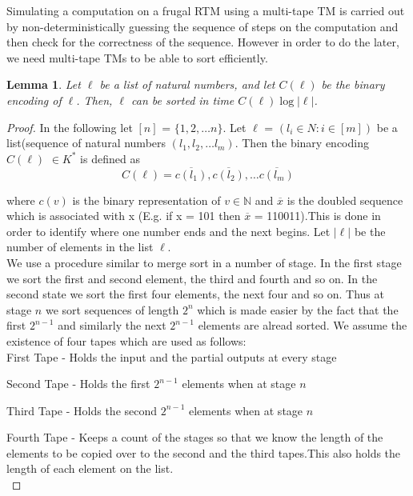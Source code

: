 \documentclass[english]{article}
\theoremstyle{plain}
\theoremstyle{definition}
\theoremstyle{plain}
\newtheorem{lem}[thm]{Lemma}
\begin{document}
Simulating a computation on a frugal RTM using a multi-tape TM is
carried out by non-deterministically guessing the sequence of steps on
the computation and then check for the correctness of the
sequence. However in order to do the later, we need multi-tape TMs to
be able to sort efficiently.

\begin{lem}
  Let $\ell$ be a list of natural numbers, and let $C(\ell)$ be the
  binary encoding of $\ell$. Then, $\ell$ can be sorted in time
  $C(\ell)\log|\ell|$.
\end{lem}

\begin{proof}
  In the following let $[n]$ = $\{1,2,\ldots n\}$. Let $\ell$ = $(l_i
  \in N: i \in [m])$ be a list(sequence of natural numbers $(l_1,l_2,
  \ldots l_m)$. Then the binary encoding $C(\ell)$ $\in K^*$ is
  defined as
\[
C(\ell) = \overline{c(l_1)},\overline{c(l_2)}, \ldots \overline{c(l_m)}
\]

  where $c(v)$ is the binary representation of $v \in \mathbb{N}$ and
  $\overline{x}$ is the doubled sequence which is associated with x
  (E.g. if x = 101 then $\overline{x}$ = 110011).This is done in order
  to identify where one number ends and the next begins. Let $|\ell|$
  be the number of elements in the list $\ell$.\\

  We use a procedure similar to merge sort in a number of stage. In
  the first stage we sort the first and second element, the third and
  fourth and so on. In the second state we sort the first four
  elements, the next four and so on. Thus at stage $n$ we sort
  sequences of length $2^n$ which is made easier by the fact that the
  first $2^{n-1}$ and similarly the next $2^{n-1}$ elements are alread
  sorted. We assume the existence of four tapes which are used as
  follows:\\

  First Tape - Holds the input and the partial outputs at every stage

  Second Tape - Holds the first $2^{n-1}$ elements when at stage $n$

  Third Tape - Holds the second $2^{n-1}$ elements when at stage $n$

  Fourth Tape - Keeps a count of the stages so that we know the length
  of the elements to be copied over to the second and the third
  tapes.This also holds the length of each element on the list.\\


\end{proof}
\end{document}
